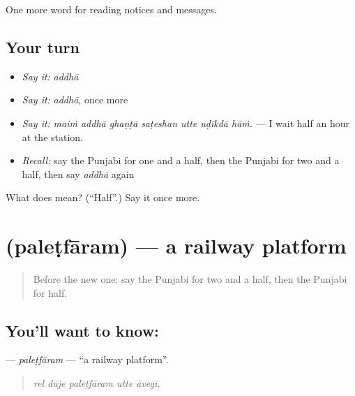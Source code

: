 \begin{grammarlens}[title={What you've built}]
One more word for reading notices and messages.
\end{grammarlens}

\subsection*{Your turn}
\begin{itemize}
\raggedright
  \item \emph{Say it:} \emph{addhā}
  \item \emph{Say it:} \emph{addhā}, once more
  \item \emph{Say it:} \emph{maiṁ addhā ghaṇṭā saṭeshan utte uḍīkdā hāṁ.} — I wait half an hour at the station.
  \item \emph{Recall:} say the Punjabi for one and a half, then the Punjabi for two and a half, then say \emph{addhā} again
\end{itemize}

\begin{tcolorbox}[breakable,colback=teal!4,colframe=teal!35!black,title={Before you move on}]
What does  mean? (\textquotedblleft{}Half\textquotedblright{}.) Say it once more.
\end{tcolorbox}
\section[\texorpdfstring{\pa{ਪਲੇਟਫ਼ਾਰਮ} (paleṭfāram)}{ਪਲੇਟਫ਼ਾਰਮ (paleṭfāram)}]{ (paleṭfāram) — a railway platform}

\label{lesson:PA-C261-paletfaram}



\begin{quote}
Before the new one: say the Punjabi for two and a half, then the Punjabi for half.
\end{quote}

\subsection*{You'll want to know: }
\textbf{} — \emph{paleṭfāram} — \textquotedblleft{}a railway platform\textquotedblright{}.

\begin{quote}
    
\end{quote}

\begin{quote}
\emph{rel dūje paleṭfāram utte āvegī.}
\end{quote}

